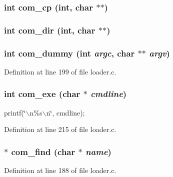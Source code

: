 \subsubsection[{com\_\-cp}]{\setlength{\rightskip}{0pt plus 5cm}int com\_\-cp (int, \/  char $\ast$$\ast$)}\label{loader_8c_ae56c0c3df03d45cb3db40a3cdaf954bf}
\subsubsection[{com\_\-dir}]{\setlength{\rightskip}{0pt plus 5cm}int com\_\-dir (int, \/  char $\ast$$\ast$)}\label{loader_8c_af91a105159b0534411621d548c8ad186}
\subsubsection[{com\_\-dummy}]{\setlength{\rightskip}{0pt plus 5cm}int com\_\-dummy (int {\em argc}, \/  char $\ast$$\ast$ {\em argv})}\label{loader_8c_acc8436c51a5376909a17f70ced234f86}


Definition at line 199 of file loader.c.

\subsubsection[{com\_\-exe}]{\setlength{\rightskip}{0pt plus 5cm}int com\_\-exe (char $\ast$ {\em cmdline})}\label{loader_8c_a52428f113965904df2b539f9e44accc7}


printf(\char`\"{}$\backslash$n\%s$\backslash$n\char`\"{}, cmdline); 



Definition at line 215 of file loader.c.

\subsubsection[{com\_\-find}]{$\ast$ com\_\-find (char $\ast$ {\em name})}\label{loader_8c_a1556e158026f1bc896d2ac8562f17a46}


Definition at line 188 of file loader.c.

